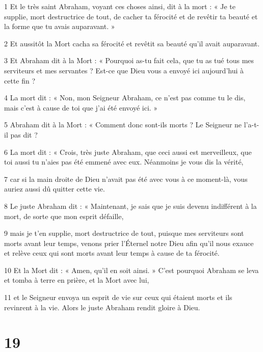 \par 1 Et le très saint Abraham, voyant ces choses ainsi, dit à la mort : « Je te supplie, mort destructrice de tout, de cacher ta férocité et de revêtir ta beauté et la forme que tu avais auparavant. »

\par 2 Et aussitôt la Mort cacha sa férocité et revêtit sa beauté qu'il avait auparavant.

\par 3 Et Abraham dit à la Mort : « Pourquoi as-tu fait cela, que tu as tué tous mes serviteurs et mes servantes ? Est-ce que Dieu vous a envoyé ici aujourd’hui à cette fin ?

\par 4 La mort dit : « Non, mon Seigneur Abraham, ce n'est pas comme tu le dis, mais c'est à cause de toi que j'ai été envoyé ici. »

\par 5 Abraham dit à la Mort : « Comment donc sont-ils morts ? Le Seigneur ne l’a-t-il pas dit ?

\par 6 La mort dit : « Crois, très juste Abraham, que ceci aussi est merveilleux, que toi aussi tu n'aies pas été emmené avec eux. Néanmoins je vous dis la vérité,

\par 7 car si la main droite de Dieu n'avait pas été avec vous à ce moment-là, vous auriez aussi dû quitter cette vie.

\par 8 Le juste Abraham dit : « Maintenant, je sais que je suis devenu indifférent à la mort, de sorte que mon esprit défaille,

\par 9 mais je t'en supplie, mort destructrice de tout, puisque mes serviteurs sont morts avant leur temps, venons prier l'Éternel notre Dieu afin qu'il nous exauce et relève ceux qui sont morts avant leur temps à cause de ta férocité.

\par 10 Et la Mort dit : « Amen, qu'il en soit ainsi. » C'est pourquoi Abraham se leva et tomba à terre en prière, et la Mort avec lui,

\par 11 et le Seigneur envoya un esprit de vie sur ceux qui étaient morts et ils revinrent à la vie. Alors le juste Abraham rendit gloire à Dieu.

\chapter{19}

